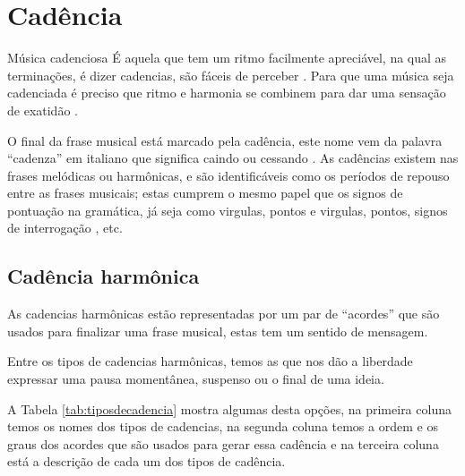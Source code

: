 \section{Cadência}
\label{sec:Cadencia}

\begin{tcbinformation}{Música cadenciosa}
\label{ref:musicacadenciosa}
É aquela que tem um ritmo facilmente apreciável, na qual as terminações, é dizer cadencias,
são fáceis de perceber \cite[pp. 60]{pedrell2009diccionario}.
Para que uma música seja cadenciada é preciso que ritmo e harmonia se combinem  
para dar uma sensação de exatidão \cite[pp. 68]{melcior1859diccionario}.
\end{tcbinformation} 


O final da frase musical está marcado pela cadência, 
este nome vem da palavra ``cadenza''  em italiano que significa caindo ou cessando \cite[pp. 34]{bennett1993elementos} \cite[pp. 68]{melcior1859diccionario}. 
As cadências existem nas frases melódicas ou harmônicas, 
e são identificáveis como os períodos de repouso entre as frases musicais;
estas cumprem o mesmo papel que os signos de pontuação na gramática, 
já seja como virgulas, pontos e virgulas, pontos, signos de interrogação
\cite[pp. 66,67]{melcior1859diccionario} \cite[pp. 34]{bennett1993elementos}, 
etc.


\subsection{Cadência harmônica}
\label{sec:CadenciaHarmonica}

As cadencias harmônicas estão representadas por um par de ``acordes''
que são usados para finalizar uma frase musical, estas tem um sentido de mensagem. 

Entre os tipos de cadencias harmônicas, 
temos as que nos dão a liberdade expressar uma pausa momentânea, suspenso ou o final de uma ideia.

A Tabela \ref{tab:tiposdecadencia} mostra algumas desta opções, 
na primeira coluna temos os nomes dos tipos de cadencias,
na segunda coluna temos a ordem e os graus dos acordes que são usados para gerar essa cadência 
e na terceira coluna está a descrição de cada um dos tipos de cadência.

